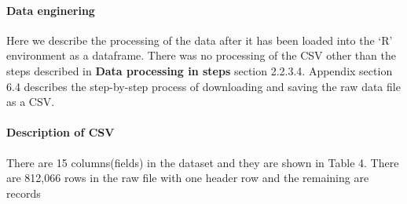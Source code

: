 \documentclass[
]{article}
\begin{document}
\hypertarget{data-enginering}{%
\paragraph{\texorpdfstring{Data enginering\\
}{Data enginering }}\label{data-enginering}}

Here we describe the processing of the data after it has been loaded
into the `R' environment as a dataframe. There was no processing of the
CSV other than the steps described in \textbf{Data processing in steps}
section 2.2.3.4. Appendix section 6.4 describes the step-by-step process
of downloading and saving the raw data file as a CSV.

\hypertarget{description-of-csv-1}{%
\paragraph{\texorpdfstring{Description of CSV\\
}{Description of CSV }}\label{description-of-csv-1}}

There are 15 columns(fields) in the dataset and they are shown in Table
4. There are 812,066 rows in the raw file with one header row and the
remaining are records
\end{document}
